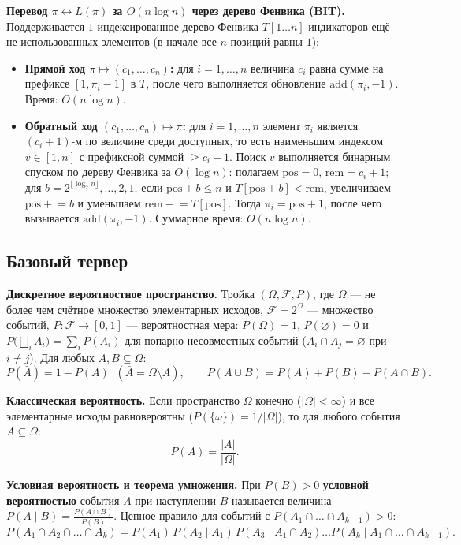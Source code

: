 \documentclass[10pt,a4paper]{article}
\renewcommand{\le}{\leqslant}
\renewcommand{\ge}{\geqslant}
\renewcommand{\emptyset}{\varnothing}
\begin{document}
\textbf{Перевод $\pi \leftrightarrow L(\pi)$ за $O(n \log n)$ через дерево Фенвика (BIT).} Поддерживается $1$-индексированное дерево Фенвика $T[1 \dots n]$ индикаторов ещё не использованных элементов (в начале все $n$ позиций равны $1$):
\begin{itemize}
  \item \textbf{Прямой ход $\pi \mapsto (c_1, \dots, c_n)$:} для $i = 1, \dots, n$ величина $c_i$ равна сумме на префиксе $[1, \pi_i - 1]$ в $T$, после чего выполняется обновление $\mathrm{add}(\pi_i, -1)$. Время: $O(n \log n)$.
  \item \textbf{Обратный ход $(c_1, \dots, c_n) \mapsto \pi$:} для $i = 1, \dots, n$ элемент $\pi_i$ является $(c_i + 1)$-м по величине среди доступных, то есть наименьшим индексом $v \in [1, n]$ с префиксной суммой $\ge c_i + 1$. Поиск $v$ выполняется бинарным спуском по дереву Фенвика за $O(\log n)$: полагаем $\mathrm{pos} = 0$, $\mathrm{rem} = c_i + 1$; для $b = 2^{\lfloor \log_2 n \rfloor}, \dots, 2, 1$, если $\mathrm{pos} + b \le n$ и $T[\mathrm{pos} + b] < \mathrm{rem}$, увеличиваем $\mathrm{pos} \mathrel{+}= b$ и уменьшаем $\mathrm{rem} \mathrel{-}= T[\mathrm{pos}]$. Тогда $\pi_i = \mathrm{pos} + 1$, после чего вызывается $\mathrm{add}(\pi_i, -1)$. Суммарное время: $O(n \log n)$.
\end{itemize}

\subsection{Базовый тервер}

\textbf{Дискретное вероятностное пространство.} Тройка $(\Omega, \mathcal{F}, P)$, где $\Omega$ — не более чем счётное множество элементарных исходов, $\mathcal{F} = 2^\Omega$ — множество событий, $P : \mathcal{F} \to [0, 1]$ — вероятностная мера: $P(\Omega) = 1$, $P(\emptyset) = 0$ и $P\bigl(\bigsqcup_i A_i\bigr) = \sum_i P(A_i)$ для попарно несовместных событий ($A_i \cap A_j = \emptyset$ при $i \ne j$). Для любых $A, B \subseteq \Omega$:
\[
  P(\bar{A}) = 1 - P(A) \;\; (\bar{A} = \Omega \setminus A), \qquad P(A \cup B) = P(A) + P(B) - P(A \cap B).
\]

\textbf{Классическая вероятность.} Если пространство $\Omega$ конечно ($|\Omega| < \infty$) и все элементарные исходы равновероятны ($P(\{\omega\}) = 1 / |\Omega|$), то для любого события $A \subseteq \Omega$:
\[
  P(A) = \frac{|A|}{|\Omega|}.
\]

\textbf{Условная вероятность и теорема умножения.} При $P(B) > 0$ \textbf{условной вероятностью} события $A$ при наступлении $B$ называется величина $P(A \mid B) = \frac{P(A \cap B)}{P(B)}$. Цепное правило для событий с $P(A_1 \cap \dots \cap A_{k-1}) > 0$:
\[
  P(A_1 \cap A_2 \cap \dots \cap A_k) = P(A_1)\, P(A_2 \mid A_1)\, P(A_3 \mid A_1 \cap A_2) \dots P(A_k \mid A_1 \cap \dots \cap A_{k-1}).
\]
\end{document}
